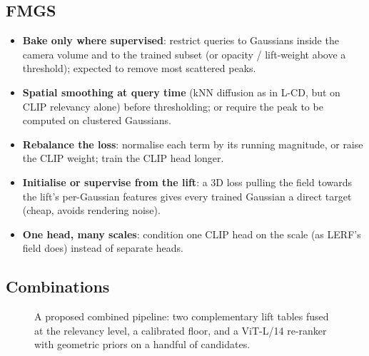 \documentclass[11pt,a4paper]{article}
\begin{document}
\subsection{FMGS}
\begin{itemize}
  \item \textbf{Bake only where supervised}: restrict queries to Gaussians inside the camera volume and to the trained
        subset (or opacity / lift-weight above a threshold); expected to remove most scattered peaks.
  \item \textbf{Spatial smoothing at query time} (kNN diffusion as in L-CD, but on CLIP relevancy alone) before
        thresholding; or require the peak to be computed on clustered Gaussians.
  \item \textbf{Rebalance the loss}: normalise each term by its running magnitude, or raise the CLIP weight; train the CLIP
        head longer.
  \item \textbf{Initialise or supervise from the lift}: a 3D loss pulling the field towards the lift's per-Gaussian
        features gives every trained Gaussian a direct target (cheap, avoids rendering noise).
  \item \textbf{One head, many scales}: condition one CLIP head on the scale (as LERF's field does) instead of separate
        heads.
\end{itemize}

\subsection{Combinations}

\begin{figure}[ht]
\centering
{}
\caption{A proposed combined pipeline: two complementary lift tables fused at the relevancy level, a calibrated floor,
and a ViT-L/14 re-ranker with geometric priors on a handful of candidates.}
\label{fig:combo}
\end{figure}
\end{document}
